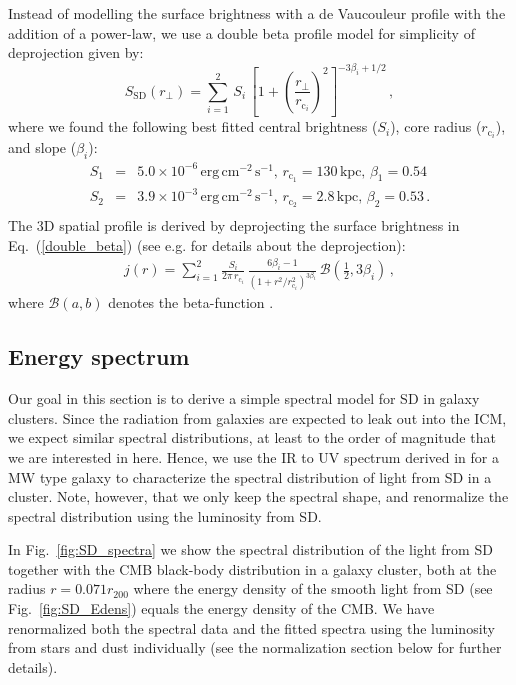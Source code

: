 \documentclass[10pt,aps,pra,reprint,amsmath,amsfonts,amssymb,showpacs]{revtex4-1}
\newcommand{\rmn}{\mathrm}
\newcommand{\sd}{\rmn{SD}}
\newcommand{\rvir}{r_{200}}
\begin{document}
Instead of modelling the surface brightness with a de Vaucouleur
profile with the addition of a power-law, we use a double beta profile
model for simplicity of deprojection given by:
\begin{equation}
S_\sd (r_\bot)= \sum_{i=1}^2 \,S_i\, 
\left[1 + \left( \frac{r_\bot}{r_{\mathrm{c}_i}}\right)^2\right]
^{-3\beta_i + 1/2}\,,
\label{double_beta}
\end{equation}
where we found the following best fitted central brightness ($S_i$),
core radius ($r_{\mathrm{c}_i}$), and slope ($\beta_i$):
\begin{eqnarray}
 S_1&=&5.0\times10^{-6}\,\rmn{erg}\,\rmn{cm}^{-2}\,\rmn{s}^{-1},\,
r_{\mathrm{c}_1}=130\,\rmn{kpc},\,
\beta_1=0.54\nonumber\\
 S_2&=&3.9\times10^{-3}\,\rmn{erg}\,\rmn{cm}^{-2}\,\rmn{s}^{-1},\,
r_{\mathrm{c}_2}=2.8\,\rmn{kpc},\,
\beta_2=0.53\,.\nonumber\\
\label{fit_spatial_IR}
\end{eqnarray}
The 3D spatial profile is derived by deprojecting the surface
brightness in Eq.~(\ref{double_beta}) (see
e.g. \cite{2004A&A...413...17P} for details about the deprojection):
\begin{eqnarray}
  j(r)  = \sum_{i=1}^2 \frac{S_i}{2\pi\,r_{\mathrm{c}_i}}\,
  \frac{6 \beta_i - 1}{\left(1 + r^2/r^2_{\mathrm{c}_i}\right)^{3\beta_i}}\,
  \mathcal{B}\left(\frac{1}{2},3\beta_i\right)\,,
\end{eqnarray}
where $\mathcal{B}(a,b)$ denotes the beta-function
\cite{1965hmfw.book.....A}.


\subsection{Energy spectrum}

Our goal in this section is to derive a simple spectral model for SD in galaxy
clusters. Since the radiation from galaxies are expected to leak out into the
ICM, we expect similar spectral distributions, at least to the order of
magnitude that we are interested in here. Hence, we use the IR to UV spectrum
derived in \cite{2006ApJ...648L..29P} for a MW type galaxy to characterize the
spectral distribution of light from SD in a cluster. Note, however, that we only
keep the spectral shape, and renormalize the spectral distribution using the
luminosity from SD.

In Fig.~\ref{fig:SD_spectra} we show the spectral distribution of the
light from SD together with the CMB black-body distribution in a
galaxy cluster, both at the radius $r=0.071\rvir$ where the energy
density of the smooth light from SD (see Fig.~\ref{fig:SD_Edens})
equals the energy density of the CMB. We have renormalized both the
spectral data and the fitted spectra using the luminosity from stars
and dust individually (see the normalization section below for further
details).
\end{document}
